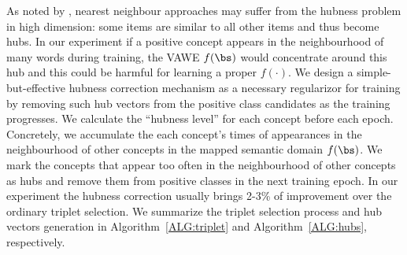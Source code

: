 \documentclass{bmvc2k}
\begin{document}
%

As noted by \cite{hubness2015}, nearest neighbour approaches may suffer from the hubness problem in high dimension: some items are similar to all other items and thus become hubs. In our experiment if a positive concept appears in the neighbourhood of many words during training, the VAWE $f(\bs)$ would concentrate around this hub and this could be harmful for learning a proper $f(\cdot)$. We design a simple-but-effective hubness correction mechanism as a necessary regularizor for training by removing such hub vectors from the positive class candidates as the training progresses. We calculate the ``hubness level'' for each concept before each epoch. Concretely,  we accumulate the each concept's times of appearances in the neighbourhood of other concepts in the mapped semantic domain $f(\bs)$. We mark the concepts that appear too often in the neighbourhood of other concepts as hubs and remove them from positive classes in the next training epoch. In our experiment the hubness correction usually brings 2-3\% of improvement over the ordinary triplet selection. We summarize the triplet selection process and hub vectors generation in Algorithm~\ref{ALG:triplet} and Algorithm~\ref{ALG:hubs}, respectively.
\end{document}
